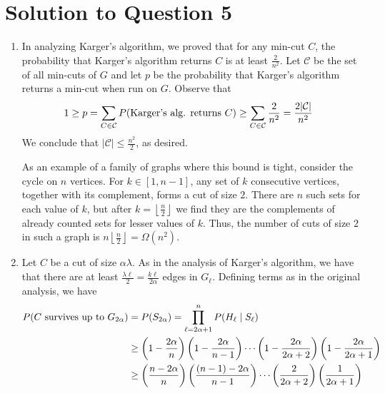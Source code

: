 \documentclass[11pt]{article}
\begin{document}
	 
	\section{Solution to Question 5}
	
	\begin{enumerate}
		\item In analyzing Karger's algorithm, we proved that for any min-cut $C$, the probability that Karger's algorithm returns $C$ is at least $\frac{2}{n^2}$.
		Let $\mathcal{C}$ be the set of all min-cuts of $G$ and let $p$ be the probability that Karger's algorithm returns a min-cut when run on $G$.
		Observe that
		\begin{align*}
		1 \geq p &= \sum_{C \in \mathcal{C}} P(\textnormal{Karger's alg. returns } C) \geq \sum_{C \in \mathcal{C}}\frac{2}{n^2} = \frac{2|\mathcal{C}|}{n^2}
		\end{align*}
		We conclude that $|\mathcal{C}| \leq \frac{n^2}{2}$, as desired.
		
		As an example of a family of graphs where this bound is tight, consider the cycle on $n$ vertices.
		For $k \in [1, n-1]$, any set of $k$ consecutive vertices, together with its complement, forms a cut of size $2$.
		There are $n$ such sets for each value of $k$, but after $k = \left\lfloor\frac{n}{2}\right\rfloor$ we find they are the complements of already counted sets for lesser values of $k$.
		Thus, the number of cuts of size $2$ in such a graph is $n\left\lfloor\frac{n}{2}\right\rfloor = \Omega(n^2)$.
		\item Let $C$ be a cut of size $\alpha \lambda$.
		As in the analysis of Karger's algorithm, we have that there are at least $\frac{\lambda \ell}{2} = \frac{k\ell}{2\alpha}$ edges in $G_{\ell}$.
		Defining terms as in the original analysis, we have
		\begin{align*}
		P(C \textnormal{ survives up to } G_{2\alpha}) &= P(S_{2 \alpha}) = \prod_{\ell = 2\alpha + 1}^n P(H_{\ell} \mid S_{\ell})\\
		&\geq \left(1 - \frac{2\alpha}{n}\right) \left(1 - \frac{2\alpha}{n-1}\right) \cdots \left(1 - \frac{2\alpha}{2\alpha + 2}\right) \left(1 - \frac{2\alpha}{2\alpha+1}\right)\\
		&\geq \left(\frac{n-2\alpha}{n}\right) \left(\frac{(n-1)-2\alpha}{n-1}\right) \cdots \left(\frac{2}{2\alpha+2}\right) \left(\frac{1}{2\alpha + 1}\right)
		\end{align*}
		

\end{enumerate}
\end{document}
